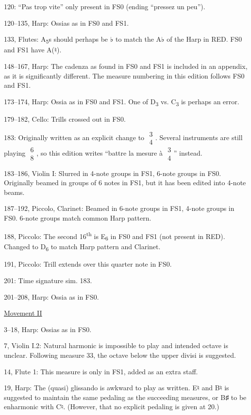 \documentclass[twoside]{article}
\begin{document}
\begin{hangparas}{15pt}{1}
\begin{multicols}{2}
120: ``Pas trop vite'' only present in FS0 (ending ``pressez un peu'').

120--135, Harp: Ossias as in FS0 and FS1.

133, Flutes: A\textsubscript{5}s should perhaps be ♭ to match the A♭ of the Harp in RED. FS0 and FS1 have A(♮).

148--167, Harp: The cadenza as found in FS0 and FS1 is included in an appendix, as it is significantly different. The measure numbering in this edition follows FS0 and FS1.

173--174, Harp: Ossia as in FS0 and FS1. One of D\textsubscript{3} vs. C\textsubscript{3} is perhaps an error.

179--182, Cello: Trills crossed out in FS0.

183: Originally written as an explicit change to $\substack{3\\4}$. Several instruments are still playing $\substack{6\\8}$, so this edition writes ``battre la mesure à $\substack{3\\4}$'' instead.

183--186, Violin I: Slurred in 4-note groups in FS1, 6-note groups in FS0. Originally beamed in groups of 6 notes in FS1, but it has been edited into 4-note beams.

187--192, Piccolo, Clarinet: Beamed in 6-note groups in FS1, 4-note groups in FS0. 6-note groups match common Harp pattern.

188, Piccolo: The second 16\textsuperscript{th} is E\textsubscript{6} in FS0 and FS1 (not present in RED). Changed to D\textsubscript{6} to match Harp pattern and Clarinet.

191, Piccolo: Trill extends over this quarter note in FS0.

201: Time signature sim. 183.

201--208, Harp: Ossia as in FS0.

\underline{Movement II}

3--18, Harp: Ossias as in FS0.

7, Violin I.2: Natural harmonic is impossible to play and intended octave is unclear. Following measure 33, the octave below the upper divisi is suggested.

14, Flute 1: This measure is only in FS1, added as an extra staff.

19, Harp: The (quasi) glissando is awkward to play as written. E♮ and B♮ is suggested to maintain the same pedaling as the succeeding measures, or B♯ to be enharmonic with C♮. (However, that no explicit pedaling is given at 20.)


\end{multicols}
\end{hangparas}
\end{document}

